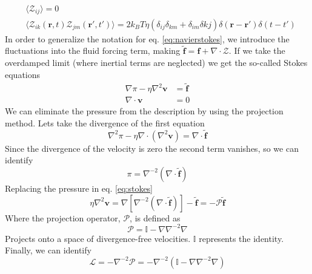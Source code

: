 \documentclass[ twoside,openright,titlepage,numbers=noenddot,%
headinclude,footinclude,cleardoublepage=empty,abstract=on,
BCOR=5mm,paper=a4,fontsize=11pt, dvipsnames
]{scrreprt}
\renewcommand{\vec}[1]{\bm{#1}}
\newcommand{\oper}[1]{\mathcal{#1}}
\newcommand{\kT}{k_B T}
\newcommand{\fpos}{r}
\newcommand{\fvel}{v}
\begin{document}
\begin{equation}
  \begin{aligned}
&  \langle \mathcal Z_{ij}\rangle = 0\\
&  \langle \mathcal Z_{ik}(\vec{\fpos},t)\mathcal Z_{jm}(\vec{\fpos}',t')\rangle = 2\kT\eta(\delta_{ij}\delta_{km} + \delta_{im}\delta{kj})\delta(\vec{\fpos}-\vec{\fpos}')\delta(t-t')
\end{aligned}
\end{equation}
In order to generalize the notation for eq. \eqref{eq:navierstokes}, we introduce the fluctuations into the fluid forcing term, making $\tilde{\vec{f}} = \vec{f} + \nabla\cdot\mathcal{Z}$.
If we take the overdamped limit (where inertial terms are neglected) we get the so-called Stokes equations
\begin{equation}
  \label{eq:stokes}
  \begin{aligned}
    \nabla \pi - \eta \nabla^2\vec{\fvel} &=  \tilde{\vec{f}}\\
    \nabla\cdot\vec{\fvel} &= 0
  \end{aligned}  
\end{equation}
We can eliminate the pressure from the description by using the projection method. Lets take the divergence of the first equation
\begin{equation}
  \nabla^2 \pi - \eta \nabla\cdot(\nabla^2\vec{\fvel}) =  \nabla\cdot\tilde{\vec{f}}
\end{equation}
Since the divergence of the velocity is zero the second term vanishes, so we can identify
\begin{equation}
  \label{eq:stokespressure}
  \pi = \nabla^{-2}(\nabla\cdot\tilde{\vec{f}})
\end{equation}
Replacing the pressure in eq. \eqref{eq:stokes}
\begin{equation}
  \eta\nabla^2\vec{\fvel} = \nabla\left[\nabla^{-2}(\nabla\cdot\tilde{\vec{f}})\right] - \tilde{\vec{f}} = -\oper{P} \tilde{\vec{f}}
\end{equation}
Where the projection operator, $\oper{P}$, is defined as
\begin{equation}
  \label{eq:projectoper}
\oper{P}  =  \mathbb{I} - \nabla\nabla^{-2}\nabla
\end{equation}
Projects onto a space of divergence-free velocities. $\mathbb{I}$ represents the identity. Finally, we can identify
\begin{equation}
  \label{eq:stokesoper}
  \oper{L} = -\nabla^{-2}\oper{P} = -\nabla^{-2}\left(\mathbb{I} - \nabla\nabla^{-2}\nabla\right)
\end{equation}
\end{document}

